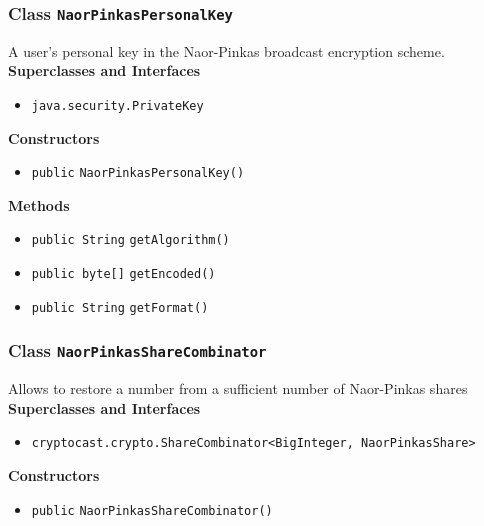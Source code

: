 \subsubsection{Class \lstinline|NaorPinkasPersonalKey|}
A user's personal key in the Naor-Pinkas broadcast encryption scheme. \\


\textbf{Superclasses and Interfaces}
\begin{itemize}
\item \lstinline|java.security.PrivateKey|
\end{itemize}



\textbf{Constructors}
\begin{itemize}
\item \lstinline|public| \lstinline|NaorPinkasPersonalKey|\lstinline|()|




\end{itemize}


\textbf{Methods}
\begin{itemize}
\item \lstinline|public String| \lstinline|getAlgorithm|\lstinline|()|




\item \lstinline|public byte[]| \lstinline|getEncoded|\lstinline|()|




\item \lstinline|public String| \lstinline|getFormat|\lstinline|()|




\end{itemize}

\subsubsection{Class \lstinline|NaorPinkasShareCombinator|}
Allows to restore a number from a sufficient number of Naor-Pinkas shares \\


\textbf{Superclasses and Interfaces}
\begin{itemize}
\item \lstinline|cryptocast.crypto.ShareCombinator<BigInteger, NaorPinkasShare>|
\end{itemize}



\textbf{Constructors}
\begin{itemize}
\item \lstinline|public| \lstinline|NaorPinkasShareCombinator|\lstinline|()|




\end{itemize}


